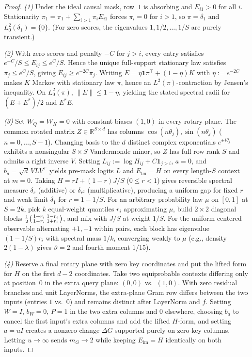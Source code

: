 \documentclass[11pt]{article}
\theoremstyle{plain}
\theoremstyle{definition}
\theoremstyle{remark}
\begin{document}
\begin{proof}
\emph{(1)} Under the ideal causal mask, row~$1$ is absorbing and $E_{i1} > 0$ for all $i$. Stationarity $\pi_1 = \pi_1 + \sum_{i > 1} \pi_i E_{i1}$ forces $\pi_i = 0$ for $i > 1$, so $\pi = \delta_1$ and $L^2_0(\delta_1) = \{0\}$. (For zero scores, the eigenvalues $1, 1/2, \dots, 1/S$ are purely transient.)

\emph{(2)} With zero scores and penalty $-C$ for $j > i$, every entry satisfies $e^{-C}/S \le E_{ij} \le e^C/S$. Hence the unique full-support stationary law satisfies $\pi_j \le e^C/S$, giving $E_{ij} \ge e^{-2C}\pi_j$. Writing $E = \eta \mathbf{1}\pi^\top + (1 - \eta)K$ with $\eta := e^{-2C}$ makes $K$ Markov with stationary law $\pi$, hence an $L^2(\pi)$-contraction by Jensen's inequality. On $L^2_0(\pi)$, $\|E\| \le 1 - \eta$, yielding the stated spectral radii for $(E + E^*)/2$ and $E^*E$.

\emph{(3)} Set $W_Q = W_K = 0$ with constant biases $(1, 0)$ in every rotary plane. The common rotated matrix $Z \in \mathbb{R}^{S \times d}$ has columns $\cos(n\theta_j), \sin(n\theta_j)$ ($n = 0, \dots, S-1$). Changing basis to the $d$ distinct complex exponentials $e^{\pm i\theta_j}$ exhibits a nonsingular $S \times S$ Vandermonde minor, so $Z$ has full row rank $S$ and admits a right inverse $V$. Setting $L_{ij} := \log H_{ij} + C\mathbf{1}_{j > i}$, $a = 0$, and $b_a = \sqrt{d}\,V L V^\top$ yields pre-mask logits $L$ and $E_{\mathrm{lm}} = H$ on every length-$S$ context at $m = 0$.
Taking $H = rI + (1-r)J/S$ ($0 \le r < 1$) gives reversible spectral measure $\delta_r$ (additive) or $\delta_{r^2}$ (multiplicative), producing a uniform gap for fixed $r$ and weak limit $\delta_1$ for $r = 1 - 1/S$. For an arbitrary probability law $\mu$ on $[0, 1]$ at $S = 2k$, pick $k$ equal-weight quantiles $r_i$ approximating $\mu$, build $2 \times 2$ diagonal blocks $\tfrac{1}{2}\begin{psmallmatrix} 1+r_i & 1-r_i \\ 1-r_i & 1+r_i \end{psmallmatrix}$, and mix with $J/S$ at weight $1/S$. For the uniform-centered observable alternating $+1, -1$ within pairs, each block has eigenvalue $(1 - 1/S)r_i$ with spectral mass $1/k$, converging weakly to $\mu$ (e.g., density $2(1-\lambda)$ gives $\vartheta = 2$ and fourth moment $1/15$).

\emph{(4)} Reserve a final rotary plane with zero key coordinates and put the lifted form for $H$ on the first $d - 2$ coordinates. Take two equiprobable contexts differing only at position~$0$ in the extra query plane: $(0, 0)$ vs.~$(1, 0)$. With zero residual branches and unit LayerNorms, the extra-plane Gram row differs between the two inputs (entries $1$ vs.~$0$) and remains distinct after LayerNorm and $f$. Setting $W = I$, $b_W = 0$, $P = 1$ in the two extra columns and $0$ elsewhere, choosing $b_a$ to cancel the first input's extra columns and add the lifted $H$-form, and setting $a = u I$ creates a nonzero change $\Delta G$ supported purely on zero-key columns. Letting $u \to \infty$ sends $m_G \to 2$ while keeping $E_{\mathrm{lm}} = H$ identically on both inputs.


\end{proof}
\end{document}
